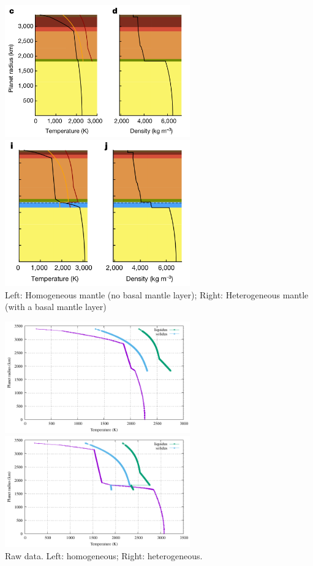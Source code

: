 \begin{itemize}
\begin{center}
\includegraphics[width=8cm]{images/mars/temperature/sadr23_a}
\includegraphics[width=8cm]{images/mars/temperature/sadr23_b}\\
{\captionfont 
Left: Homogeneous mantle (no basal mantle layer); 
Right: Heterogeneous mantle (with a basal mantle layer)}
\end{center}

\begin{center}
\includegraphics[width=8cm]{images/mars/temperature/sadr23_fig1c/T.pdf}
\includegraphics[width=8cm]{images/mars/temperature/sadr23_fig1i/T.pdf}\\
{\captionfont Raw data. Left: homogeneous; Right: heterogeneous.}
\end{center} 


\end{itemize}
